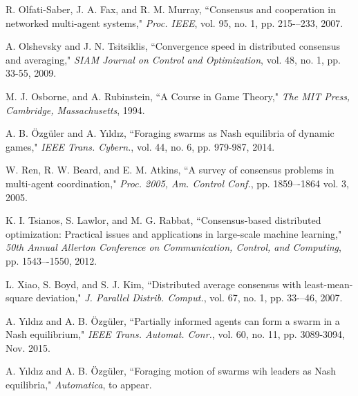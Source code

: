 \documentclass[10pt, conference, compsocconf]{IEEEtran}
\begin{document}
\begin{thebibliography}{1}
R. Olfati-Saber, J. A. Fax, and R. M. Murray, ``Consensus and cooperation in networked multi-agent systems," {\em Proc. IEEE}, vol. 95, no. 1, pp. 215-–233, 2007.

A. Olshevsky and J. N. Tsitsiklis, ``Convergence speed in distributed
consensus and averaging," {\em SIAM Journal on Control and Optimization}, vol. 48, no. 1,  pp. 33-55, 2009.

M. J. Osborne,  and A. Rubinstein, ``A Course in Game Theory," {\em The MIT Press, Cambridge, Massachusetts}, 1994.

A. B. \"{O}zg\"{u}ler and A. Y{\i}ld{\i}z, ``Foraging swarms as Nash equilibria of dynamic games," {\em IEEE Trans. Cybern.}, vol. 44, no. 6, pp. 979-987, 2014.

W. Ren, R. W. Beard, and E. M. Atkins, ``A survey of consensus problems in multi-agent coordination," {\em Proc. 2005, Am. Control Conf.}, pp. 1859–-1864 vol. 3, 2005.

K. I. Tsianos, S. Lawlor, and M. G. Rabbat, ``Consensus-based distributed optimization: Practical issues and applications in large-scale machine learning," {\em 50th Annual Allerton Conference on Communication, Control, and Computing}, pp. 1543–-1550, 2012.

L. Xiao, S. Boyd, and S. J. Kim, ``Distributed average consensus with least-mean-square deviation," {\em J. Parallel Distrib. Comput.}, vol. 67, no. 1, pp. 33-–46, 2007.

A. Y{\i}ld{\i}z and A. B. \"{O}zg\"{u}ler, ``Partially informed agents can form a swarm in a Nash equilibrium," {\em IEEE Trans. Automat. Conr.}, vol. 60, no. 11, pp. 3089-3094, Nov. 2015.

A. Y{\i}ld{\i}z and A. B. \"{O}zg\"{u}ler, ``Foraging motion of swarms wih leaders as Nash equilibria," {\em Automatica}, to appear. 

\end{thebibliography}


\end{document}
